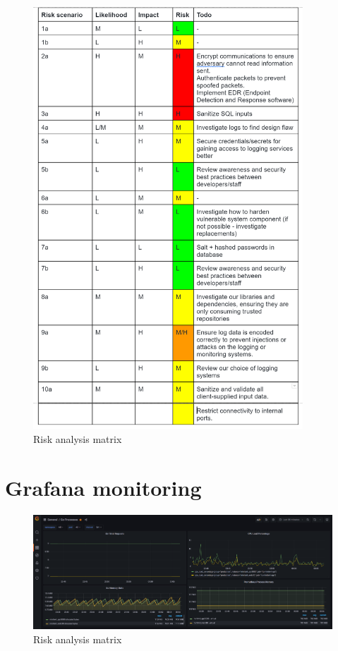\begin{figure}[!htb]
	\centering
	\includegraphics[width=0.9\textwidth]{images/riskanalysismatrix.png}
	\caption{Risk analysis matrix}
	\label{fig:riskmatrix}
\end{figure}

\newpage
\section{Grafana monitoring}
\label{app:grafanamonitoring}

\begin{figure}[!htb]
	\centering
	\includegraphics[width=1.\textwidth]{images/monitoring.png}
	\caption{Risk analysis matrix}
	\label{fig:monitoring}
\end{figure}

